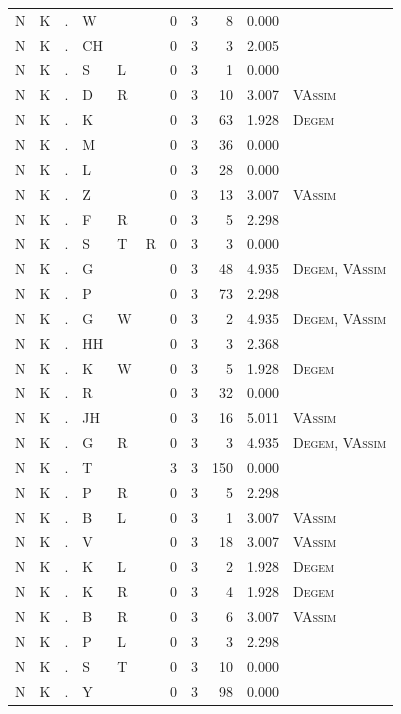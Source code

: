 \documentclass[12pt]{article}
\begin{document}
\begin{longtable}{r@{ } r@{ } c@{ } l@{ } l@{ } l@{ } r r r r l }
N & K & . & W &  &  & 0 & 3 & 8 & 0.000 &  \\
N & K & . & CH &  &  & 0 & 3 & 3 & 2.005 &  \\
N & K & . & S & L &  & 0 & 3 & 1 & 0.000 &  \\
N & K & . & D & R &  & 0 & 3 & 10 & 3.007 & \textsc{VAssim} \\
N & K & . & K &  &  & 0 & 3 & 63 & 1.928 & \textsc{Degem} \\
N & K & . & M &  &  & 0 & 3 & 36 & 0.000 &  \\
N & K & . & L &  &  & 0 & 3 & 28 & 0.000 &  \\
N & K & . & Z &  &  & 0 & 3 & 13 & 3.007 & \textsc{VAssim} \\
N & K & . & F & R &  & 0 & 3 & 5 & 2.298 &  \\
N & K & . & S & T & R & 0 & 3 & 3 & 0.000 &  \\
N & K & . & G &  &  & 0 & 3 & 48 & 4.935 & \textsc{Degem}, \textsc{VAssim} \\
N & K & . & P &  &  & 0 & 3 & 73 & 2.298 &  \\
N & K & . & G & W &  & 0 & 3 & 2 & 4.935 & \textsc{Degem}, \textsc{VAssim} \\
N & K & . & HH &  &  & 0 & 3 & 3 & 2.368 &  \\
N & K & . & K & W &  & 0 & 3 & 5 & 1.928 & \textsc{Degem} \\
N & K & . & R &  &  & 0 & 3 & 32 & 0.000 &  \\
N & K & . & JH &  &  & 0 & 3 & 16 & 5.011 & \textsc{VAssim} \\
N & K & . & G & R &  & 0 & 3 & 3 & 4.935 & \textsc{Degem}, \textsc{VAssim} \\
N & K & . & T &  &  & 3 & 3 & 150 & 0.000 &  \\
N & K & . & P & R &  & 0 & 3 & 5 & 2.298 &  \\
N & K & . & B & L &  & 0 & 3 & 1 & 3.007 & \textsc{VAssim} \\
N & K & . & V &  &  & 0 & 3 & 18 & 3.007 & \textsc{VAssim} \\
N & K & . & K & L &  & 0 & 3 & 2 & 1.928 & \textsc{Degem} \\
N & K & . & K & R &  & 0 & 3 & 4 & 1.928 & \textsc{Degem} \\
N & K & . & B & R &  & 0 & 3 & 6 & 3.007 & \textsc{VAssim} \\
N & K & . & P & L &  & 0 & 3 & 3 & 2.298 &  \\
N & K & . & S & T &  & 0 & 3 & 10 & 0.000 &  \\
N & K & . & Y &  &  & 0 & 3 & 98 & 0.000 &  \\

\end{longtable}
\end{document}
